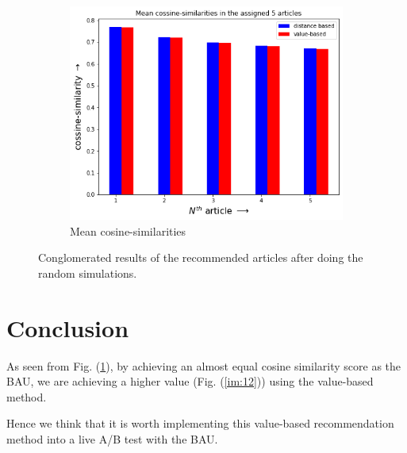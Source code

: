 \documentclass[11]{article}
\begin{document}
\begin{figure}[H]
	\begin{subfigure}[t]{0.49\textwidth}
		\centering
		\includegraphics[width=1.0\linewidth]{images/cossim_recomm.png}
		\caption{Mean cosine-similarities} \label{im:22}
	\end{subfigure}	
	
	\caption{Conglomerated results of the recommended articles after doing the random simulations.} \label{im:33}
\end{figure}




\section{Conclusion}
As seen from Fig. (\ref{im:22}), by achieving an almost equal cosine similarity score as the BAU, we are achieving a higher value (Fig. (\ref{im:12})) using the value-based method.

Hence we think that it is worth implementing this value-based recommendation method into a live A/B test with the BAU.

\newpage
\end{document}
